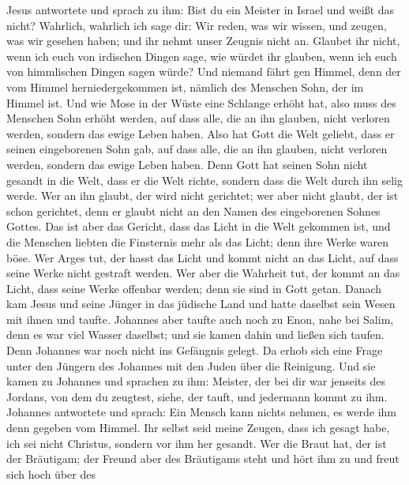  Jesus antwortete und sprach zu ihm: Bist du ein Meister
in Israel und weißt das nicht?  Wahrlich, wahrlich ich
sage dir: Wir reden, was wir wissen, und zeugen, was wir gesehen haben;
und ihr nehmt unser Zeugnis nicht an.  Glaubet ihr nicht,
wenn ich euch von irdischen Dingen sage, wie würdet ihr glauben, wenn
ich euch von himmlischen Dingen sagen würde?  Und niemand
fährt gen Himmel, denn der vom Himmel herniedergekommen ist, nämlich des
Menschen Sohn, der im Himmel ist.  Und wie Mose in der
Wüste eine Schlange erhöht hat, also muss des Menschen Sohn erhöht
werden,  auf dass alle, die an ihn glauben, nicht
verloren werden, sondern das ewige Leben haben.  Also hat
Gott die Welt geliebt, dass er seinen eingeborenen Sohn gab, auf dass
alle, die an ihn glauben, nicht verloren werden, sondern das ewige Leben
haben.  Denn Gott hat seinen Sohn nicht gesandt in die
Welt, dass er die Welt richte, sondern dass die Welt durch ihn selig
werde.  Wer an ihn glaubt, der wird nicht gerichtet; wer
aber nicht glaubt, der ist schon gerichtet, denn er glaubt nicht an den
Namen des eingeborenen Sohnes Gottes.  Das ist aber das
Gericht, dass das Licht in die Welt gekommen ist, und die Menschen
liebten die Finsternis mehr als das Licht; denn ihre Werke waren böse.
 Wer Arges tut, der hasst das Licht und kommt nicht an
das Licht, auf dass seine Werke nicht gestraft werden. 
Wer aber die Wahrheit tut, der kommt an das Licht, dass seine Werke
offenbar werden; denn sie sind in Gott getan.  Danach kam
Jesus und seine Jünger in das jüdische Land und hatte daselbst sein
Wesen mit ihnen und taufte.  Johannes aber taufte auch
noch zu Enon, nahe bei Salim, denn es war viel Wasser daselbst; und sie
kamen dahin und ließen sich taufen.  Denn Johannes war
noch nicht ins Gefängnis gelegt.  Da erhob sich eine
Frage unter den Jüngern des Johannes mit den Juden über die Reinigung.
 Und sie kamen zu Johannes und sprachen zu ihm: Meister,
der bei dir war jenseits des Jordans, von dem du zeugtest, siehe, der
tauft, und jedermann kommt zu ihm.  Johannes antwortete
und sprach: Ein Mensch kann nichts nehmen, es werde ihm denn gegeben vom
Himmel.  Ihr selbst seid meine Zeugen, dass ich gesagt
habe, ich sei nicht Christus, sondern vor ihm her gesandt.
 Wer die Braut hat, der ist der Bräutigam; der Freund
aber des Bräutigams steht und hört ihm zu und freut sich hoch über des
